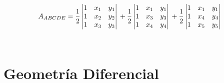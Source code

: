 \documentclass[letterpaper, 12pt]{article}
\begin{document}
\begin{itemize}
            \begin{equation*}
            A_{ABCDE} = \frac{1}{2}
                \begin{vmatrix}
                    1 & x_{1} & y_{1}\\
                    1 & x_{2} & y_{2}\\
                    1 & x_{3} & y_{3}\\
                \end{vmatrix}
            \thinspace + \frac{1}{2}
                \begin{vmatrix}
                    1 & x_{1} & y_{1}\\
                    1 & x_{3} & y_{3}\\
                    1 & x_{4} & y_{4}\\
                \end{vmatrix}
            \thinspace + \frac{1}{2}
                \begin{vmatrix}
                    1 & x_{1} & y_{1}\\
                    1 & x_{4} & y_{4}\\
                    1 & x_{5} & y_{5}\\
                \end{vmatrix}
            \end{equation*}\\
            
    \end{itemize}
    
    \newpage
            
\section{Geometría Diferencial}
\end{document}
